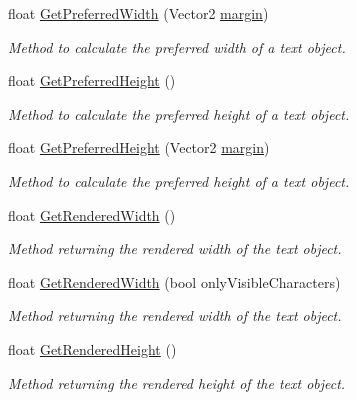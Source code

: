 \begin{DoxyCompactItemize}
float \mbox{\hyperlink{class_t_m_pro_1_1_t_m_p___text_a9d95266b16671a64895102e97b936029}{Get\+Preferred\+Width}} (Vector2 \mbox{\hyperlink{class_t_m_pro_1_1_t_m_p___text_a4b5ff3199be4781bc7b033d780bfb547}{margin}})
\begin{DoxyCompactList}\small\item\em Method to calculate the preferred width of a text object. \end{DoxyCompactList}\item 
float \mbox{\hyperlink{class_t_m_pro_1_1_t_m_p___text_a754e5a230232f1ed55615e55a3ed32ad}{Get\+Preferred\+Height}} ()
\begin{DoxyCompactList}\small\item\em Method to calculate the preferred height of a text object. \end{DoxyCompactList}\item 
float \mbox{\hyperlink{class_t_m_pro_1_1_t_m_p___text_a5eee2a6865eefd94c604facff1168d9e}{Get\+Preferred\+Height}} (Vector2 \mbox{\hyperlink{class_t_m_pro_1_1_t_m_p___text_a4b5ff3199be4781bc7b033d780bfb547}{margin}})
\begin{DoxyCompactList}\small\item\em Method to calculate the preferred height of a text object. \end{DoxyCompactList}\item 
float \mbox{\hyperlink{class_t_m_pro_1_1_t_m_p___text_a1c36b279765c95e9530d1e3ce2511d8d}{Get\+Rendered\+Width}} ()
\begin{DoxyCompactList}\small\item\em Method returning the rendered width of the text object. \end{DoxyCompactList}\item 
float \mbox{\hyperlink{class_t_m_pro_1_1_t_m_p___text_aab9263cb25a2af2ef736c9e2d0f63e40}{Get\+Rendered\+Width}} (bool only\+Visible\+Characters)
\begin{DoxyCompactList}\small\item\em Method returning the rendered width of the text object. \end{DoxyCompactList}\item 
float \mbox{\hyperlink{class_t_m_pro_1_1_t_m_p___text_a935fe16317c1b8250ca6b748dba7bd19}{Get\+Rendered\+Height}} ()
\begin{DoxyCompactList}\small\item\em Method returning the rendered height of the text object. \end{DoxyCompactList}\item 

\end{DoxyCompactItemize}
